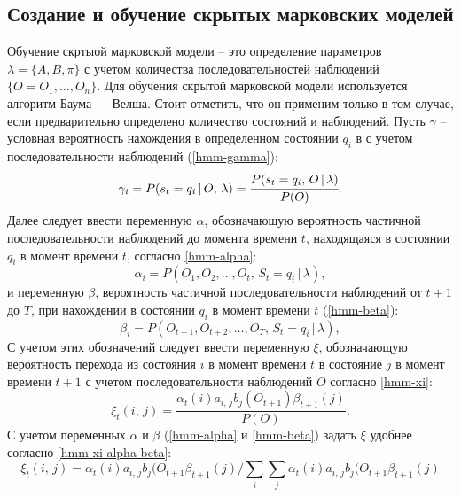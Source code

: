\subsection{Создание и обучение скрытых марковских моделей}
Обучение скртыой марковской модели -- это определение параметров $\lambda = \{A, B, \pi\}$ с учетом количества последовательностей наблюдений $\{O = O_1, \dots, O_n\}$. Для обучения скрытой  марковской модели используется алгоритм Баума --- Велша. Стоит отметить, что он применим только в том случае, если предварительно определено количество состояний и наблюдений.
Пусть $\gamma$ -- условная вероятность нахождения в определенном состоянии $q_i$ в с учетом последовательности наблюдений (\ref{hmm-gamma}):
\begin{equation}\label{hmm-gamma}
	\gamma_i = P(s_t = q_i\,|\,O,\,\lambda) = \cfrac{P(s_t = q_i,\,O\,|\,\lambda)}{P(O)}.
\end{equation}
Далее следует ввести переменную $\alpha$, обозначающую вероятность частичной последовательности наблюдений до момента времени $t$, находящаяся в состоянии $q_i$ в момент времени $t$, согласно \ref{hmm-alpha}:
\begin{equation}\label{hmm-alpha}
	\alpha_i = P(O_1, O_2, \dots, O_t,\, S_t = q_i\,|\,\lambda),
\end{equation}
и переменную $\beta$, вероятность частичной последовательности наблюдений от $t + 1$ до $T$, при нахождении в состоянии $q_i$ в момент времени $t$ (\ref{hmm-beta}): 
\begin{equation}\label{hmm-beta}
	\beta_i = P(O_{t+1}, O_{t+2}, \dots, O_T,\, S_t = q_i\,|\,\lambda),
\end{equation}
С учетом этих обозначений следует ввести переменную $\xi$, обозначающую вероятность перехода из состояния $i$ в момент времени $t$ в состояние $j$ в момент времени $t + 1$ с учетом последовательности наблюдений $O$ согласно \ref{hmm-xi}:
\begin{equation}\label{hmm-xi}
	\xi_t(i,\,j) = \frac{\alpha_t(i)a_{i,\,j}b_j(O_{t+1})\beta_{t+1}(j)}{P(O)}.
\end{equation}
С учетом переменных $\alpha$ и $\beta$ (\ref{hmm-alpha} и \ref{hmm-beta}) задать $\xi$ удобнее согласно \ref{hmm-xi-alpha-beta}:
\begin{equation}\label{hmm-xi-alpha-beta}
	\xi_t(i,\,j) = \alpha_t(i)a_{i,\,j}b_j(O_{t+1}\beta_{t+1}(j) \bigg/ \sum_{i}\sum_{j}\alpha_t(i)a_{i,\,j}b_j(O_{t+1}\beta_{t+1}(j)
\end{equation}
